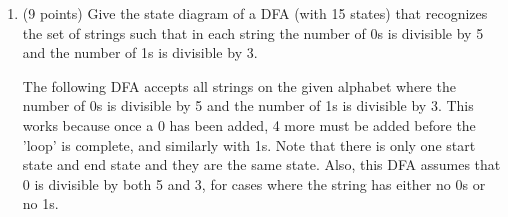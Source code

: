 \documentclass[11pt]{article}
\begin{document}
\begin{enumerate}
\begin{proof}
Therefore, the original statement holds and thus the $\sqrt{3}$ is an irrational number.  

\end{proof}
Collaborators:

\item (9 points) Give the state diagram of a DFA (with 15 states) that recognizes the set of strings such that in each string the number of 0s is divisible by 5 and the number of 1s is divisible by 3.

The following DFA accepts all strings on the given alphabet where the number of 0s is divisible by 5 and the number of 1s is divisible by 3.  This works because once a 0 has been added, 4 more must be added before the 'loop' is complete, and similarly with 1s.  Note that there is only one start state and end state and they are the same state.  Also, this DFA assumes that 0 is divisible by both 5 and 3, for cases where the string has either no 0s or no 1s.  


\end{enumerate}
\end{document}
